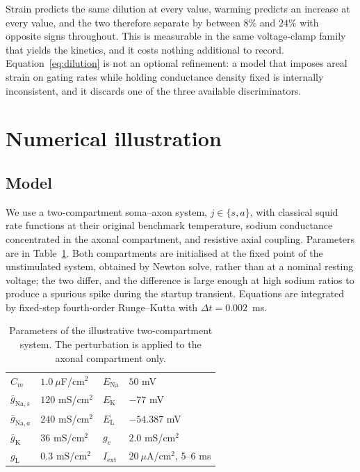 Strain predicts the same dilution at every value, warming predicts an increase
at every value, and the two therefore separate by between $8\%$ and $24\%$ with
opposite signs throughout. This is measurable in the same voltage-clamp
family that yields the kinetics, and it costs nothing additional to record.
Equation~\eqref{eq:dilution} is not an optional refinement: a model that imposes
areal strain on gating rates while holding conductance density fixed is
internally inconsistent, and it discards one of the three available
discriminators.

\section{Numerical illustration}
\label{sec:numerics}

\subsection{Model}

We use a two-compartment soma--axon system, $j\in\{s,a\}$, with classical
squid rate functions \citep{hodgkin1952} at their original benchmark
temperature, sodium conductance concentrated in the axonal compartment, and
resistive axial coupling. Parameters are in Table~\ref{tab:params}. Both
compartments are initialised at the fixed point of the unstimulated system,
obtained by Newton solve, rather than at a nominal resting voltage; the two
differ, and the difference is large enough at high sodium ratios to produce a
spurious spike during the startup transient. Equations are integrated by
fixed-step fourth-order Runge--Kutta with $\Delta t=0.002$~ms.

\begin{table}[ht]
\centering
\caption{Parameters of the illustrative two-compartment system. The perturbation
is applied to the axonal compartment only.}
\label{tab:params}
\begin{tabular}{@{}llll@{}}
\toprule
$C_m$ & $1.0\ \mu$F/cm$^2$ & $E_{\mathrm{Na}}$ & $50$ mV \\
$\bar g_{\mathrm{Na},s}$ & $120$ mS/cm$^2$ & $E_{\mathrm K}$ & $-77$ mV \\
$\bar g_{\mathrm{Na},a}$ & $240$ mS/cm$^2$ & $E_{\mathrm L}$ & $-54.387$ mV \\
$\bar g_{\mathrm K}$ & $36$ mS/cm$^2$ & $g_c$ & $2.0$ mS/cm$^2$ \\
$g_{\mathrm L}$ & $0.3$ mS/cm$^2$ & $I_{\mathrm{ext}}$ &
  $20\ \mu$A/cm$^2$, $5$--$6$ ms \\
\bottomrule
\end{tabular}
\end{table}

